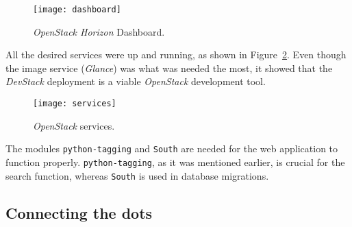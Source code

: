 \begin{figure}[t]
  \begin{center}
    \leavevmode
    \texttt{[image: dashboard]}
    \caption{\textit{OpenStack Horizon} Dashboard.}
    \label{fig:stack-dashboard}
  \end{center}
\end{figure}

All the desired services were up and running, as shown in Figure~\ref{fig:services}. Even though the image service (\textit{Glance}) was what was needed the most, it showed that the \textit{DevStack} deployment is a viable \textit{OpenStack} development tool.

\begin{figure}[h]
  \begin{center}
    \leavevmode
    \texttt{[image: services]}
    \caption{\textit{OpenStack} services.}
    \label{fig:services}
  \end{center}
\end{figure}






The modules \texttt{python-tagging} and \texttt{South} are needed for the web application to function properly. \texttt{python-tagging}, as it was mentioned earlier, is crucial for the search function, whereas \texttt{South} is used in database migrations.


\clearpage
\subsection{Connecting the dots}\label{subsec:architecture}

